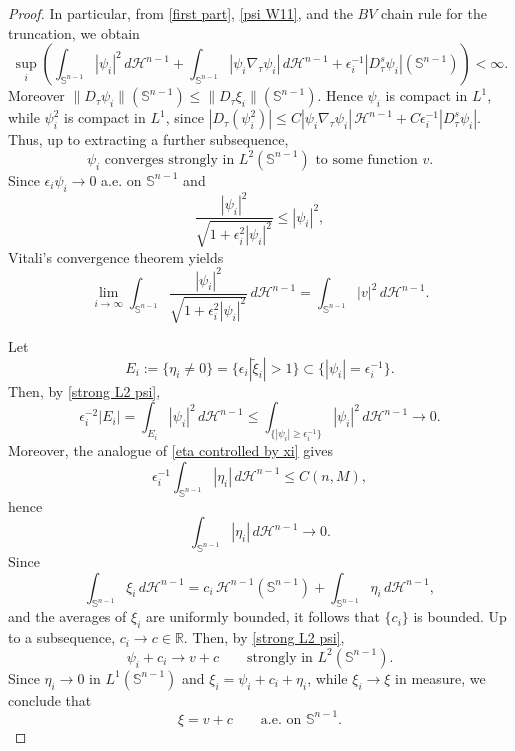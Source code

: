\documentclass[10pt,a4paper]{amsart}
\newcommand{\HH}{\mathscr H}
\def\ez{\epsilon}
\begin{document}
\begin{proof}
In particular, from \eqref{first part}, \eqref{psi W11}, and the $BV$ chain
rule for the truncation, we obtain
$$
\sup_i \left(
\int_{\mathbb S^{n-1}} |\psi_i|^2\,d\mathscr H^{n-1}
+
\int_{\mathbb S^{n-1}} |\psi_i\nabla_\tau \psi_i|\,d\mathscr H^{n-1}
+\epsilon_i^{-1}|D^s_\tau\psi_i|(\mathbb S^{n-1})
\right)<\infty.
$$
Moreover $\|D_\tau\psi_i\|(\mathbb S^{n-1})\le
\|D_\tau\xi_i\|(\mathbb S^{n-1})$. Hence $\psi_i$ is compact in $L^1$, while
$\psi_i^2$ is compact in $L^1$, since
$|D_\tau(\psi_i^2)|\le C|\psi_i\nabla_\tau\psi_i|\,\HH^{n-1}
+C\epsilon_i^{-1}|D^s_\tau\psi_i|$. Thus, up to extracting a further subsequence,
\begin{equation}\label{strong L2 psi}
\text{$\psi_i$ converges strongly in $L^2(\mathbb S^{n-1})$ to some function $v$.}
\end{equation}
Since $\epsilon_i\psi_i\to 0$ a.e. on $\mathbb S^{n-1}$ and
$$\frac{|\psi_i|^2}{\sqrt{1+\ez_i^2|\psi_i|^2}}\le |\psi_i|^2, $$
Vitali's convergence theorem yields
\begin{equation}\label{strong L2 psi2}
\lim_{i\to \infty}\int_{\mathbb S^{n-1}}  \frac{|\psi_i|^2}{\sqrt{1+\ez_i^2|\psi_i|^2}} \,d\mathscr H^{n-1}=  \int_{\mathbb S^{n-1}} {|v|^2}  \,d\mathscr H^{n-1}.
\end{equation}

Let
$$
E_i:=\{\eta_i\neq 0\}=\{\epsilon_i|\tilde\xi_i|>1\}\subset \{|\psi_i|=\epsilon_i^{-1}\}.
$$
Then, by \eqref{strong L2 psi},
\begin{equation}\label{measure to 0}
\epsilon_i^{-2}|E_i|
=
\int_{E_i} |\psi_i|^2\,d\mathscr H^{n-1}
\le
\int_{\{|\psi_i|\ge \epsilon_i^{-1}\}} |\psi_i|^2\,d\mathscr H^{n-1}
\longrightarrow 0.
\end{equation}
Moreover, the analogue of \eqref{eta controlled by xi} gives
$$
\epsilon_i^{-1}\int_{\mathbb S^{n-1}}|\eta_i|\,d\mathscr H^{n-1}\le C(n,M),
$$
hence
$$
\int_{\mathbb S^{n-1}}|\eta_i|\,d\mathscr H^{n-1}\to 0.
$$
Since
$$
\int_{\mathbb S^{n-1}}\xi_i\,d\mathscr H^{n-1}
=
c_i\,\mathscr H^{n-1}(\mathbb S^{n-1})+\int_{\mathbb S^{n-1}}\eta_i\,d\mathscr H^{n-1},
$$
and the averages of $\xi_i$ are uniformly bounded, it follows that $\{c_i\}$ is bounded. Up to a subsequence,
$
c_i\to c\in\mathbb R.
$
Then, by \eqref{strong L2 psi},
$$
\psi_i+c_i \to v+c \qquad\text{strongly in }L^2(\mathbb S^{n-1}).
$$
Since $\eta_i\to 0$ in $L^1(\mathbb S^{n-1})$ and $\xi_i=\psi_i+c_i+\eta_i$, while $\xi_i\to\xi$ in measure, we conclude that
$$
\xi=v+c \qquad\text{a.e. on }\mathbb S^{n-1}.
$$


\end{proof}
\end{document}
